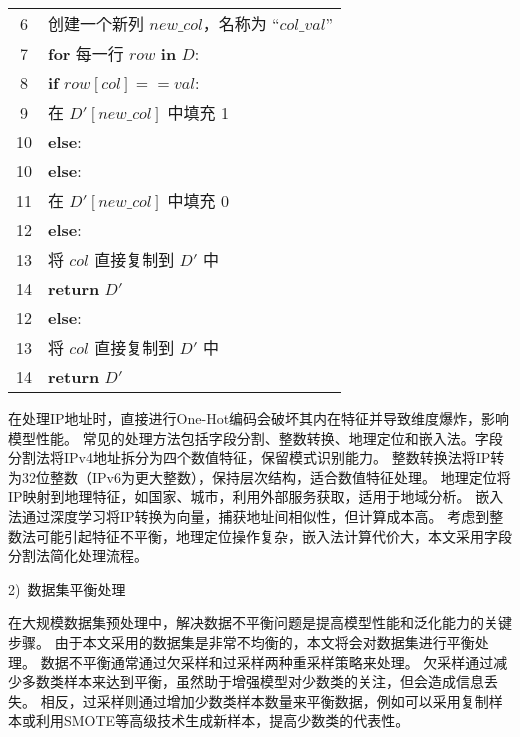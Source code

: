 \begin{table}[htbp]
\begin{tabularx}{1.0\textwidth}{cl}
		6  & \quad\quad\quad 创建一个新列 $new\_col$，名称为 ``$col\_val$''       \\
		7  & \quad\quad\quad \textbf{for} 每一行 $row$ \textbf{in} $D$:           \\
		8  & \quad\quad\quad\quad \textbf{if} $row[col] == val$:                  \\
		9  & \quad\quad\quad\quad\quad 在 $D'[new\_col]$ 中填充 1                 \\
		10 & \quad\quad\quad\quad \textbf{else}:                                  \\
		10 & \quad\quad\quad\quad \textbf{else}:                                  \\
		11 & \quad\quad\quad\quad\quad 在 $D'[new\_col]$ 中填充 0                 \\
		12 & \quad \textbf{else}:                                                 \\
		13 & \quad\quad 将 $col$ 直接复制到 $D'$ 中                               \\
		14 & \textbf{return} $D'$                                                 \\
		12 & \quad \textbf{else}:                                                 \\
		13 & \quad\quad 将 $col$ 直接复制到 $D'$ 中                               \\
		14 & \textbf{return} $D'$                                                 \\
		\bottomrule
	\end{tabularx}
\end{table}

在处理IP地址时，直接进行One-Hot编码会破坏其内在特征并导致维度爆炸，影响模型性能。
常见的处理方法包括字段分割、整数转换、地理定位和嵌入法。字段分割法将IPv4地址拆分为四个数值特征，保留模式识别能力。
整数转换法将IP转为32位整数（IPv6为更大整数），保持层次结构，适合数值特征处理。
地理定位将IP映射到地理特征，如国家、城市，利用外部服务获取，适用于地域分析。
嵌入法通过深度学习将IP转换为向量，捕获地址间相似性，但计算成本高。
考虑到整数法可能引起特征不平衡，地理定位操作复杂，嵌入法计算代价大，本文采用字段分割法简化处理流程。\par

2)~数据集平衡处理\par
在大规模数据集预处理中，解决数据不平衡问题是提高模型性能和泛化能力的关键步骤。
由于本文采用的数据集是非常不均衡的，本文将会对数据集进行平衡处理。
数据不平衡通常通过欠采样和过采样两种重采样策略来处理。
欠采样通过减少多数类样本来达到平衡，虽然助于增强模型对少数类的关注，但会造成信息丢失。
相反，过采样则通过增加少数类样本数量来平衡数据，例如可以采用复制样本或利用SMOTE等高级技术生成新样本，提高少数类的代表性。\par

